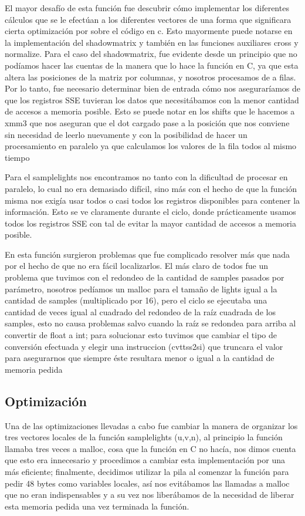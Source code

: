 \documentclass[a4paper,10pt]{article}
\begin{document}
El mayor desafío de esta función fue descubrir cómo implementar los diferentes cálculos que se le efectúan a los diferentes vectores de una forma que significara cierta optimización por sobre el código en c. Esto mayormente puede notarse en la implementación del shadowmatrix y también en las funciones auxiliares cross y normalize. Para el caso del shadowmatrix, fue evidente desde un principio que no podíamos hacer las cuentas de la manera que lo hace la función en C, ya que esta altera las posiciones de la matriz por columnas, y nosotros procesamos de a filas. Por lo tanto, fue necesario determinar bien de entrada cómo nos aseguraríamos de que los registros SSE tuvieran los datos que necesitábamos con la menor cantidad de accesos a memoria posible. Esto se puede notar en los shifts que le hacemos a xmm3 que nos aseguran que  el dot cargado pase a la posición que nos conviene sin necesidad de leerlo nuevamente y con la posibilidad de hacer un procesamiento en paralelo ya que calculamos los valores de la fila todos al mismo tiempo

Para el samplelights nos encontramos no tanto con la dificultad de procesar en paralelo, lo cual no era demasiado difícil, sino más con el hecho de que la función misma nos exigía usar todos o casi todos los registros disponibles para contener la información. Esto se ve claramente durante el ciclo, donde prácticamente usamos todos los registros SSE con tal de evitar la mayor cantidad de accesos a memoria posible.

En esta función surgieron problemas que fue complicado resolver más que nada por el hecho de que no era fácil localizarlos. El más claro de todos fue un problema que tuvimos con el redondeo de la cantidad de samples pasados por parámetro, nosotros pedíamos un malloc para el tamaño de lights igual a la cantidad de samples (multiplicado por 16), pero el ciclo se ejecutaba una cantidad de veces igual al cuadrado del redondeo de la raíz cuadrada de los samples, esto no causa problemas salvo cuando la raíz se redondea para arriba al convertir de float a int; para solucionar esto tuvimos que cambiar el tipo de conversión efectuada y elegir una instruccion (cvttss2si) que truncara el valor para asegurarnos que siempre éste resultara menor o igual a la cantidad de memoria pedida 

\subsection{Optimización}

Una de las optimizaciones llevadas a cabo fue cambiar la manera de organizar los tres vectores locales de la función samplelights (u,v,n), al principio la función llamaba tres veces a malloc, cosa que la función en C no hacía, nos dimos cuenta que esto era innecesario y procedimos a cambiar esta implementación por una más eficiente; finalmente, decidimos utilizar la pila al comenzar la función para pedir 48 bytes como variables locales, así nos evitábamos las llamadas a malloc que no eran indispensables y a su vez nos liberábamos de la necesidad de liberar esta memoria pedida una vez terminada la función.
\end{document}
